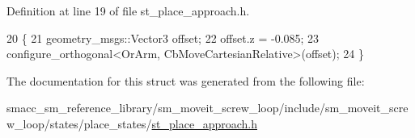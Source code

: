 Definition at line 19 of file st\+\_\+place\+\_\+approach.\+h.


\begin{DoxyCode}
20     \{
21         geometry\_msgs::Vector3 offset;
22         offset.z = -0.085;
23         configure\_orthogonal<OrArm, CbMoveCartesianRelative>(offset);
24     \}
\end{DoxyCode}


The documentation for this struct was generated from the following file\+:\begin{DoxyCompactItemize}
\item 
smacc\+\_\+sm\+\_\+reference\+\_\+library/sm\+\_\+moveit\+\_\+screw\+\_\+loop/include/sm\+\_\+moveit\+\_\+screw\+\_\+loop/states/place\+\_\+states/\hyperlink{sm__moveit__screw__loop_2include_2sm__moveit__screw__loop_2states_2place__states_2st__place__approach_8h}{st\+\_\+place\+\_\+approach.\+h}\end{DoxyCompactItemize}
